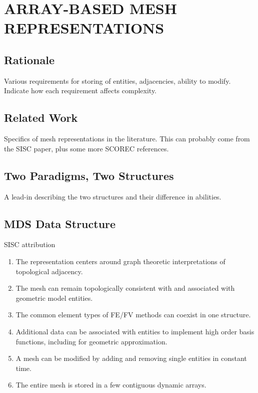 
\chapter{ARRAY-BASED MESH REPRESENTATIONS}
\label{chap:struct}

\section{Rationale}

Various requirements for storing of entities, adjacencies,
ability to modify.
Indicate how each requirement affects complexity.

\section{Related Work}

Specifics of mesh representations in the literature.
This can probably come from the SISC paper, plus
some more SCOREC references.

\section{Two Paradigms, Two Structures}

{\color{red} A lead-in describing the two structures and their difference
in abilities.}

\section{MDS Data Structure}
\label{sec:sisc}

{\color{red} SISC attribution}

\begin{enumerate}
\item The representation centers around graph theoretic interpretations
of topological adjacency.
\item The mesh can remain topologically consistent with and associated with
geometric model entities.
\item The common element types of FE/FV methods can coexist in one structure.
\item Additional data can be associated with entities to implement
high order basis functions, including for geometric approximation.
\item A mesh can be modified by adding and removing single entities in constant time.
\item The entire mesh is stored in a few contiguous dynamic arrays.
\end{enumerate}

